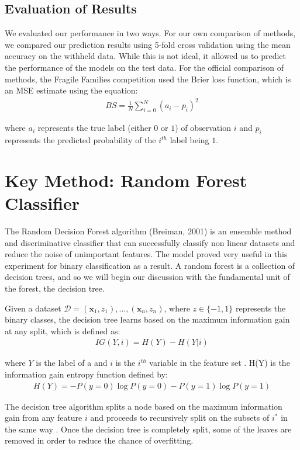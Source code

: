 \documentclass{article} %
\begin{document}
\subsection{Evaluation of Results}

We evaluated our performance in two ways. For our own comparison of methods, we compared our prediction results using 5-fold cross validation using the mean accuracy on the withheld data. While this is not ideal, it allowed us to predict the performance of the models on the test data. For the official comparison of methods, the Fragile Families competition used the Brier loss function, which is an MSE estimate using the equation:
\begin{align*}
BS = \frac{1}{N} \sum_{i=0}^{N} (a_i - p_i)^2
\end{align*}

where $a_i$ represents the true label (either $0$ or $1$) of observation $i$ and $p_i$ represents the predicted probability of the $i^{th}$ label being $1$.

\section{Key Method: Random Forest Classifier}

The Random Decision Forest algorithm (Breiman, 2001) is an ensemble method and discriminative classifier that can successfully classify non linear datasets and reduce the noise of unimportant features. The model proved very useful in this experiment for binary classification as a result. A random forest is a collection of decision trees, and so we will begin our discussion with the fundamental unit of the forest, the decision tree.

Given a dataset $\mathcal{D} = {(\textbf{x}_1,z_1),...,(\textbf{x}_n,z_n)}$, where $z \in \{-1, 1\}$ represents the binary classes, the decision tree learns based on the maximum information gain at any split, which is defined as:
\begin{align*}
IG(Y,i) = H(Y) - H(Y \vert i)
\end{align*}

where $Y$ is the label of a  and $i$ is the $i^{th}$ variable in the feature set \cite{quinlan}. H(Y) is the information gain entropy function defined by:
\begin{align*}
H(Y) = -P(y = 0) \log P(y = 0) - P(y = 1) \log P(y = 1)
\end{align*}

The decision tree algorithm splits a node based on the maximum information gain from any feature $i$ and proceeds to recursively split on the subsets of $i^*$ in the same way \cite{mlapp}. Once the decision tree is completely split, some of the leaves are removed in order to reduce the chance of overfitting.
\end{document}

